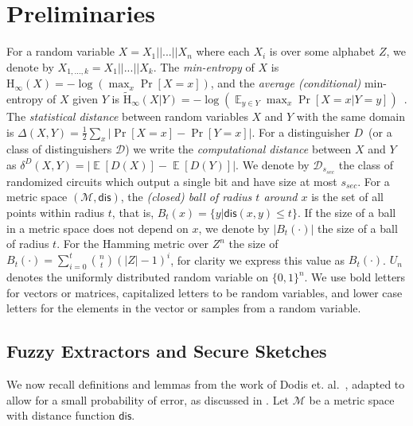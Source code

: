 \documentclass[11pt]{article}
\DeclareMathOperator*{\expe}{\mathbb{E}}
\newcommand{\dis}{\ensuremath{\mathsf{dis}}}
\newcommand{\Hoo}{\mathrm{H}_\infty}
\newcommand{\Hav}{\tilde{\mathrm{H}}_\infty}
\def\col{\mathrm{Col}}
\newcommand{\authnote}[2]{{\textcolor{red}{\textsf{#1 notes: }\textcolor{blue}{ #2}}\marginpar{\textcolor{red}{\textbf{!!!!!}}}}}
\newcommand{\authnote}[2]{}
\newcommand{\lnote}[1]{{\authnote{Leo}{#1}}}
\begin{document}
\section{Preliminaries}
\label{sec:preliminaries}
For a random variable $X = X_1||...|| X_n$ where each $X_i$ is over some alphabet $Z$, we denote by $X_{1,..., k} = X_1||...|| X_k$.  The {\em min-entropy} of $X$ is $\Hoo(X) = -\log(\max_x \Pr[X=x])$, 
and the {\em average (conditional)} min-entropy of $X$ given $Y$ is  $\Hav(X|Y) = -\log(\expe_{y\in Y} \max_{x} \Pr[X=x|Y=y])$~\cite[Section 2.4]{DBLP:journals/siamcomp/DodisORS08}.  
The {\em statistical distance} between random variables $X$ and $Y$ with the same domain is $\Delta(X,Y) = \frac12 \sum_x |\Pr[X=x] - \Pr[Y=x]|$. %
For a distinguisher $D$~(or a class of distinguishers $\mathcal{D}$) we write the \emph{computational distance} between $X$ and $Y$ as $\delta^D(X,Y) = \left| \expe[D(X)]-\expe[D(Y)]\right |$.  We denote by $\mathcal{D}_{s_{sec}}$ the class of randomized circuits which output a single bit and have size at most $s_{sec}$.
For a metric space $(\mathcal{M}, \dis)$, the \emph{(closed) ball of radius $t$ around $x$} is the set of all points within radius $t$, that is, $B_t(x) = \{y| \dis(x, y)\leq t\}$.  If the size of a ball in a metric space does not depend on $x$, we denote by $|B_t(\cdot)|$ the size of a ball of radius $t$.  For the Hamming metric over $Z^n$ the size of $B_t(\cdot) = \sum_{i=0}^t {n \choose t} (|Z|-1)^i $, for clarity we express this value as $B_t(\cdot)$.  $U_n$ denotes the uniformly  distributed random variable on $\{0,1\}^n$.
We use bold letters for vectors or matrices, capitalized letters to be random variables, and lower case letters for the elements in the vector or samples from a random variable. 

\subsection{Fuzzy Extractors and Secure Sketches}
\label{sec:fuzzy extractors}

We now recall definitions and lemmas from the work of Dodis et. al.~\cite[Sections 2.5--4.1]{DBLP:journals/siamcomp/DodisORS08}, adapted to allow for a small probability of error, as discussed in \cite[Sections 8]{DBLP:journals/siamcomp/DodisORS08}.  Let $\mathcal{M}$ be a metric space with distance function $\dis$.%
\end{document}
